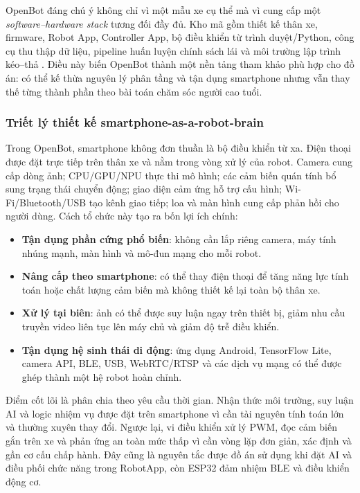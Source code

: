 OpenBot đáng chú ý không chỉ vì một mẫu xe cụ thể mà vì cung cấp một \textit{software--hardware stack} tương đối đầy đủ. Kho mã gồm thiết kế thân xe, firmware, Robot App, Controller App, bộ điều khiển từ trình duyệt/Python, công cụ thu thập dữ liệu, pipeline huấn luyện chính sách lái và môi trường lập trình kéo--thả . Điều này biến OpenBot thành một nền tảng tham khảo phù hợp cho đồ án: có thể kế thừa nguyên lý phân tầng và tận dụng smartphone nhưng vẫn thay thế từng thành phần theo bài toán chăm sóc người cao tuổi.

\subsubsection{Triết lý thiết kế smartphone-as-a-robot-brain}

Trong OpenBot, smartphone không đơn thuần là bộ điều khiển từ xa. Điện thoại được đặt trực tiếp trên thân xe và nằm trong vòng xử lý của robot. Camera cung cấp dòng ảnh; CPU/GPU/NPU thực thi mô hình; các cảm biến quán tính bổ sung trạng thái chuyển động; giao diện cảm ứng hỗ trợ cấu hình; Wi-Fi/Bluetooth/USB tạo kênh giao tiếp; loa và màn hình cung cấp phản hồi cho người dùng. Cách tổ chức này tạo ra bốn lợi ích chính:

\begin{itemize}
    \item \textbf{Tận dụng phần cứng phổ biến}: không cần lắp riêng camera, máy tính nhúng mạnh, màn hình và mô-đun mạng cho mỗi robot.
    \item \textbf{Nâng cấp theo smartphone}: có thể thay điện thoại để tăng năng lực tính toán hoặc chất lượng cảm biến mà không thiết kế lại toàn bộ thân xe.
    \item \textbf{Xử lý tại biên}: ảnh có thể được suy luận ngay trên thiết bị, giảm nhu cầu truyền video liên tục lên máy chủ và giảm độ trễ điều khiển.
    \item \textbf{Tận dụng hệ sinh thái di động}: ứng dụng Android, TensorFlow Lite, camera API, BLE, USB, WebRTC/RTSP và các dịch vụ mạng có thể được ghép thành một hệ robot hoàn chỉnh.
\end{itemize}

Điểm cốt lõi là phân chia theo yêu cầu thời gian. Nhận thức môi trường, suy luận AI và logic nhiệm vụ được đặt trên smartphone vì cần tài nguyên tính toán lớn và thường xuyên thay đổi. Ngược lại, vi điều khiển xử lý PWM, đọc cảm biến gắn trên xe và phản ứng an toàn mức thấp vì cần vòng lặp đơn giản, xác định và gần cơ cấu chấp hành. Đây cũng là nguyên tắc được đồ án sử dụng khi đặt AI và điều phối chức năng trong RobotApp, còn ESP32 đảm nhiệm BLE và điều khiển động cơ.

